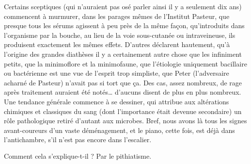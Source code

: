 \documentclass[french,twoside]{book} %
\begin{document}
Certains sceptiques (qui n’auraient pas osé parler ainsi il y a seulement dix ans) commencent à murmurer, dans les parages mêmes de l’Institut Pasteur, que presque tous les sérums agissent à peu près de la même façon, qu’introduits dans l’organisme par la bouche, au lieu de la voie sous-cutanée ou intraveineuse, ils produisent exactement les mêmes effets. D’autres déclarent hautement, qu’à l’origine des grandes diathèses il y a certainement autre chose que les infiniment petits, que la minimoflore et la minimofaune, que l’étiologie uniquement bacillaire ou bactérienne est une vue de l’esprit trop simpliste, que Peter (l’adversaire acharné de Pasteur) n’avait pas si tort que ça. Des cas, assez nombreux, de rage après traitement auraient été notés… d’aucuns disent de plus en plus nombreux. Une tendance générale commence à se dessiner, qui attribue aux altérations chimiques et classiques du sang (dont l’importance était devenue secondaire) un rôle pathologique retiré d’autant aux microbes. Bref, nous avons là tous les signes avant-coureurs d’un vaste déménagement, et le piano, cette fois, est déjà dans l’antichambre, s’il n’est pas encore dans l’escalier.\par
Comment cela s’explique-t-il ? Par le pithiatisme.\par
\end{document}
